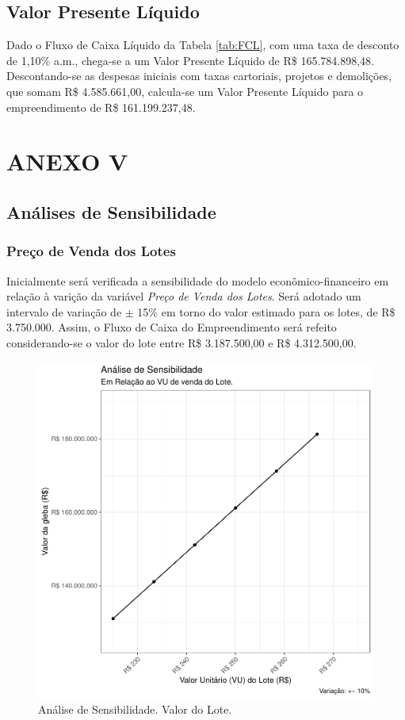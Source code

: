 \documentclass[
  10pt,
  a4paper]{article}
\begin{document}
\subsection{Valor Presente Líquido}\label{valor-presente-luxedquido}

Dado o Fluxo de Caixa Líquido da Tabela \ref{tab:FCL}, com uma taxa de
desconto de 1,10\% a.m., chega-se a um Valor Presente Líquido de R\$
165.784.898,48. Descontando-se as despesas iniciais com taxas
cartoriais, projetos e demolições, que somam R\$ 4.585.661,00,
calcula-se um Valor Presente Líquido para o empreendimento de R\$
161.199.237,48.

\newpage

\section*{ANEXO V}\label{anexo-v}

\subsection*{Análises de
Sensibilidade}\label{anuxe1lises-de-sensibilidade}

\subsubsection*{Preço de Venda dos
Lotes}\label{preuxe7o-de-venda-dos-lotes}

Inicialmente será verificada a sensibilidade do modelo
econômico-financeiro em relação à varição da variável \emph{Preço de
Venda dos Lotes}. Será adotado um intervalo de variação de \(\pm\) 15\%
em torno do valor estimado para os lotes, de R\$ 3.750.000. Assim, o
Fluxo de Caixa do Empreendimento será refeito considerando-se o valor do
lote entre R\$ 3.187.500,00 e R\$ 4.312.500,00.

\begin{figure}[H]

{\centering \includegraphics[width=0.7\linewidth]{images/SensLote-1} 

}

\caption{Análise de Sensibilidade. Valor do Lote.}\label{fig:SensLote}
\end{figure}
\end{document}
